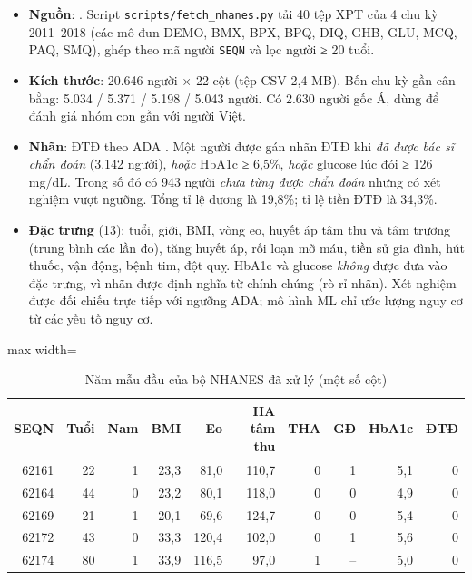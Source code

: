 \begin{itemize}
  \item \textbf{Nguồn}: . Script \texttt{scripts/fetch\_nhanes.py} tải 40 tệp XPT của 4 chu kỳ 2011–2018 (các mô-đun DEMO, BMX, BPX, BPQ, DIQ, GHB, GLU, MCQ, PAQ, SMQ), ghép theo mã người \texttt{SEQN} và lọc người ≥ 20 tuổi.
  \item \textbf{Kích thước}: 20.646 người × 22 cột (tệp CSV 2,4 MB). Bốn chu kỳ gần cân bằng: 5.034 / 5.371 / 5.198 / 5.043 người. Có 2.630 người gốc Á, dùng để đánh giá nhóm con gần với người Việt.
  \item \textbf{Nhãn}: ĐTĐ theo ADA \cite{ada2024}. Một người được gán nhãn ĐTĐ khi \emph{đã được bác sĩ chẩn đoán} (3.142 người), \emph{hoặc} HbA1c ≥ 6,5\%, \emph{hoặc} glucose lúc đói ≥ 126 mg/dL. Trong số đó có 943 người \emph{chưa từng được chẩn đoán} nhưng có xét nghiệm vượt ngưỡng. Tổng tỉ lệ dương là 19,8\%; tỉ lệ tiền ĐTĐ là 34,3\%.
  \item \textbf{Đặc trưng} (13): tuổi, giới, BMI, vòng eo, huyết áp tâm thu và tâm trương (trung bình các lần đo), tăng huyết áp, rối loạn mỡ máu, tiền sử gia đình, hút thuốc, vận động, bệnh tim, đột quỵ. HbA1c và glucose \emph{không} được đưa vào đặc trưng, vì nhãn được định nghĩa từ chính chúng (rò rỉ nhãn). Xét nghiệm được đối chiếu trực tiếp với ngưỡng ADA; mô hình ML chỉ ước lượng nguy cơ từ các yếu tố nguy cơ.
\end{itemize}

\begin{table}[H]
\centering
\caption{Năm mẫu đầu của bộ NHANES đã xử lý (một số cột)}
\label{tab:nhanes-head}
\small
\begin{adjustbox}{max width=\linewidth}
\begin{tabular}{@{}rrrrrrrrrr@{}}
\toprule
\textbf{SEQN} & \textbf{Tuổi} & \textbf{Nam} & \textbf{BMI} & \textbf{Eo} & \textbf{HA tâm thu} & \textbf{THA} & \textbf{GĐ} & \textbf{HbA1c} & \textbf{ĐTĐ} \\
\midrule
62161 & 22 & 1 & 23,3 & 81,0 & 110,7 & 0 & 1 & 5,1 & 0 \\
62164 & 44 & 0 & 23,2 & 80,1 & 118,0 & 0 & 0 & 4,9 & 0 \\
62169 & 21 & 1 & 20,1 & 69,6 & 124,7 & 0 & 0 & 5,4 & 0 \\
62172 & 43 & 0 & 33,3 & 120,4 & 102,0 & 0 & 1 & 5,6 & 0 \\
62174 & 80 & 1 & 33,9 & 116,5 & 97,0 & 1 & -- & 5,0 & 0 \\
\bottomrule
\end{tabular}
\end{adjustbox}
\end{table}


